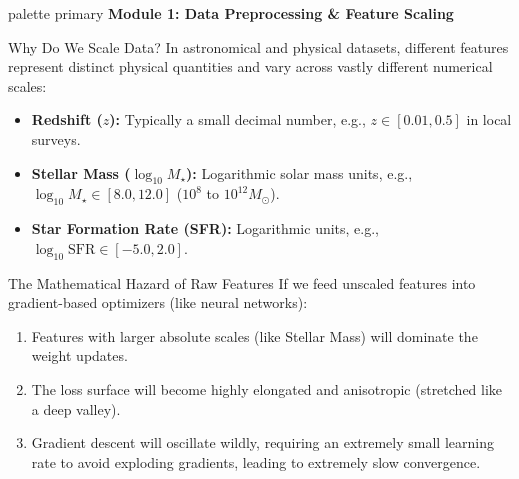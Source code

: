 \documentclass[9pt]{beamer}
\begin{document}
\begin{frame}[plain]
  \vfill
  \centering
  \begin{beamercolorbox}[sep=8pt,center,shadow=true,rounded=true]{palette primary}
    \textbf{Module 1: Data Preprocessing \& Feature Scaling}
  \end{beamercolorbox}
  \vfill
\end{frame}

\begin{frame}{Why Do We Scale Data?}
  In astronomical and physical datasets, different features represent distinct physical quantities and vary across vastly different numerical scales:
  \begin{itemize}
    \item \textbf{Redshift ($z$):} Typically a small decimal number, e.g., $z \in [0.01, 0.5]$ in local surveys.
    \item \textbf{Stellar Mass ($\log_{10} M_\star$):} Logarithmic solar mass units, e.g., $\log_{10} M_\star \in [8.0, 12.0]$ ($10^8$ to $10^{12} M_\odot$).
    \item \textbf{Star Formation Rate (SFR):} Logarithmic units, e.g., $\log_{10} \text{SFR} \in [-5.0, 2.0]$.
  \end{itemize}
  \begin{alertblock}{The Mathematical Hazard of Raw Features}
    If we feed unscaled features into gradient-based optimizers (like neural networks):
    \begin{enumerate}
      \item Features with larger absolute scales (like Stellar Mass) will dominate the weight updates.
      \item The loss surface will become highly elongated and anisotropic (stretched like a deep valley).
      \item Gradient descent will oscillate wildly, requiring an extremely small learning rate to avoid exploding gradients, leading to extremely slow convergence.
    \end{enumerate}
  \end{alertblock}
\end{frame}
\end{document}
